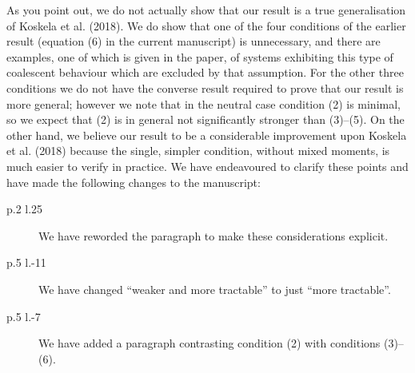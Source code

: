 \documentclass{article}
\begin{document}
\begin{enumerate}
As you point out, we do not actually show that our result is a true generalisation of Koskela et al. (2018).
We do show that one of the four conditions of the earlier result (equation (6) in the current manuscript) is unnecessary, and there are examples, one of which is given in the paper, of systems exhibiting this type of coalescent behaviour which are excluded by that assumption. 
For the other three conditions we do not have the converse result required to prove that our result is more general; however we note that in the neutral case condition (2) is minimal, so we expect that (2) is in general not significantly stronger than (3)--(5).
On the other hand, we believe our result to be a considerable improvement upon Koskela et al. (2018) because the single, simpler condition, without mixed moments, is much easier to verify in practice.
We have endeavoured to clarify these points and have made the following changes to the manuscript:
\begin{description}
\item[p.2 l.25] We have reworded the paragraph to make these considerations explicit.
\item[p.5 l.-11] We have changed ``weaker and more tractable'' to just ``more tractable''.
\item[p.5 l.-7] We have added a paragraph contrasting condition (2) with conditions (3)--(6). 
\end{description}
\end{enumerate}
\end{document}
